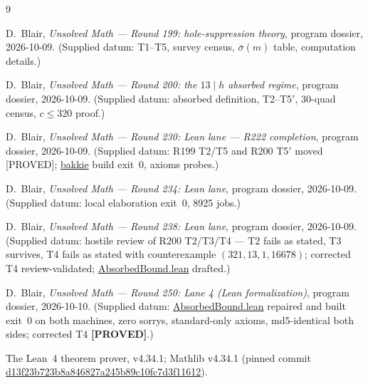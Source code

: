 \documentclass[11pt,a4paper]{article}
\theoremstyle{definition}
\begin{document}
\begin{thebibliography}{9}

D.~Blair,
\emph{Unsolved Math --- Round 199: hole-suppression theory},
program dossier, 2026-10-09.
(Supplied datum: T1--T5, survey census, $\bar\sigma(m)$ table,
computation details.)

D.~Blair,
\emph{Unsolved Math --- Round 200: the $13\mid h$ absorbed regime},
program dossier, 2026-10-09.
(Supplied datum: absorbed definition, T2--T5$'$, 30-quad census,
$c\le320$ proof.)

D.~Blair,
\emph{Unsolved Math --- Round 230: Lean lane --- R222 completion},
program dossier, 2026-10-09.
(Supplied datum: R199 T2/T5 and R200 T5$'$ moved [PROVED];
\url{bakkie} build exit~0, axioms probes.)

D.~Blair,
\emph{Unsolved Math --- Round 234: Lean lane},
program dossier, 2026-10-09.
(Supplied datum: local elaboration exit~0, 8925 jobs.)

D.~Blair,
\emph{Unsolved Math --- Round 238: Lean lane},
program dossier, 2026-10-09.
(Supplied datum: hostile review of R200 T2/T3/T4 --- T2 fails as
stated, T3 survives, T4 fails as stated with counterexample
$(321,13,1,16678)$; corrected T4 review-validated;
\url{AbsorbedBound.lean} drafted.)

D.~Blair,
\emph{Unsolved Math --- Round 250: Lane 4 (Lean formalization)},
program dossier, 2026-10-10.
(Supplied datum: \url{AbsorbedBound.lean} repaired and built
exit~0 on both machines, zero sorrys, standard-only axioms,
md5-identical both sides; corrected T4 \textbf{[PROVED]}.)

The Lean~4 theorem prover, v4.34.1; Mathlib v4.34.1 (pinned commit
\url{d13f23b723b8a846827a245b89c10fc7d3f11612}).

\end{thebibliography}
\end{document}
